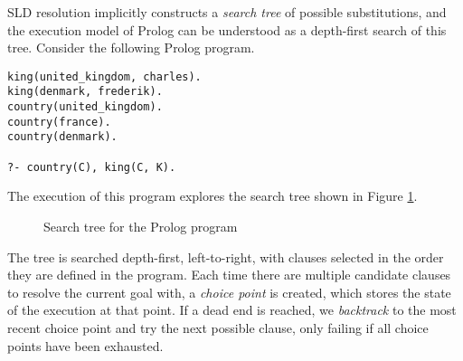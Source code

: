 SLD resolution implicitly constructs a \emph{search tree} of possible substitutions, and the execution model of Prolog can be understood as a depth-first search of this tree. Consider the following Prolog program.

\begin{center}
\begin{verbatim}
king(united_kingdom, charles).
king(denmark, frederik).
country(united_kingdom).
country(france).
country(denmark).

?- country(C), king(C, K).
\end{verbatim}
\end{center}

The execution of this program explores the search tree shown in Figure \ref{fig:prolog-search-tree}.

\begin{figure}[H]
\begin{center}
\end{center}
\caption{Search tree for the Prolog program}
\label{fig:prolog-search-tree}
\end{figure}

The tree is searched depth-first, left-to-right, with clauses selected in the order they are defined in the program. Each time there are multiple candidate clauses to resolve the current goal with, a \emph{choice point} is created, which stores the state of the execution at that point. If a dead end is reached, we \emph{backtrack} to the most recent choice point and try the next possible clause, only failing if all choice points have been exhausted.

